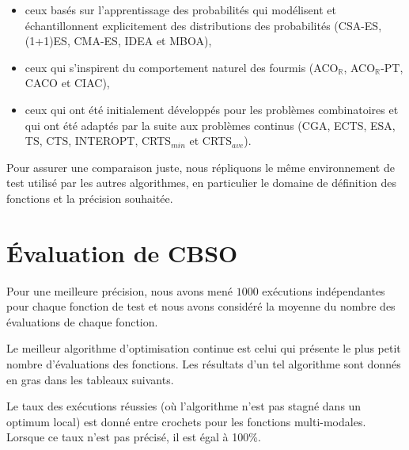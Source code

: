 \begin{itemize}
	\item ceux basés sur l'apprentissage des probabilités qui
	modélisent et échantillonnent explicitement des distributions des
	probabilités (CSA-ES, (1+1)ES, CMA-ES, IDEA et MBOA),
	\item ceux qui s'inspirent du comportement naturel des fourmis (ACO$_\mathbb{R}$, ACO$_\mathbb{R}$-PT, CACO et CIAC),
	\item ceux qui ont été initialement développés pour
	les problèmes combinatoires et qui ont été adaptés par la suite aux problèmes continus (CGA, ECTS, ESA, TS, CTS, INTEROPT, CRTS$_{min}$ et CRTS$_{ave}$).
\end{itemize}

\begin{spacing}{1.5}
	Pour assurer une comparaison juste, nous répliquons le même environnement de test utilisé par les autres algorithmes, en particulier le domaine de définition des fonctions et la précision souhaitée.
\end{spacing}
\section{Évaluation de CBSO}
Pour une meilleure précision, nous avons mené $1000$ exécutions indépendantes pour chaque fonction de test et nous avons considéré la moyenne du nombre des évaluations de chaque fonction.
 
Le meilleur algorithme d'optimisation continue est celui qui présente le plus petit nombre d'évaluations des fonctions. Les résultats d'un tel algorithme sont donnés en gras dans les tableaux suivants.

Le taux des exécutions réussies (où l'algorithme n'est pas stagné dans un optimum local) est donné entre crochets pour les fonctions multi-modales. Lorsque ce taux n'est pas précisé, il est égal à 100\%.\\

